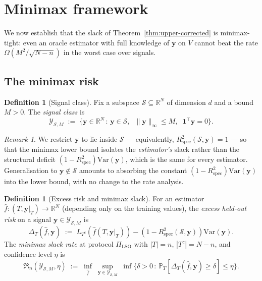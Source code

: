 \documentclass[11pt,a4paper]{article}
\theoremstyle{plain}
\theoremstyle{definition}
\newtheorem{definition}[theorem]{Definition}
\theoremstyle{remark}
\newtheorem{remark}[theorem]{Remark}
\newcommand{\by}{\mathbf{y}}
\newcommand{\bone}{\mathbf{1}}
\newcommand{\R}{\mathbb{R}}
\newcommand{\Var}{\mathrm{Var}}
\newcommand{\Rspec}{R^2_{\mathrm{spec}}}
\newcommand{\Scal}{\mathcal{S}}
\newcommand{\Ycal}{\mathcal{Y}}
\newcommand{\frR}{\mathfrak{R}}
\begin{document}
\section{Minimax framework}
\label{sec:minimax}

We now establish that the slack of Theorem~\ref{thm:upper-corrected} is
minimax-tight: even an oracle estimator with full knowledge of $\by$ on
$V$ cannot beat the rate $\Omega(M^2/\sqrt{N-n})$ in the worst case
over signals.

\subsection{The minimax risk}

\begin{definition}[Signal class]
\label{def:signal-class}
Fix a subspace $\Scal \subseteq \R^N$ of dimension $d$ and a bound
$M > 0$.  The \emph{signal class} is
\begin{equation}
    \Ycal_{\Scal, M}
    \;:=\; \{ \by \in \R^N \,:\, \by \in \Scal,\;\; \|\by\|_\infty \leq M,\;\; \bone^\top \by = 0\}.
    \label{eq:signal-class}
\end{equation}
\end{definition}

\begin{remark}
\label{rem:why-signal-in-S}
We restrict $\by$ to lie inside $\Scal$ — equivalently, $\Rspec(\Scal, \by) = 1$ —
so that the minimax lower bound isolates the \emph{estimator's} slack rather
than the structural deficit $(1-\Rspec)\Var(\by)$, which is the same for every
estimator.  Generalisation to $\by \notin \Scal$ amounts to absorbing the
constant $(1-\Rspec)\Var(\by)$ into the lower bound, with no change to the
rate analysis.
\end{remark}

\begin{definition}[Excess risk and minimax slack]
\label{def:excess-risk}
For an estimator $\hat f : (T, \by|_T) \to \R^N$ (depending only on the
training values), the \emph{excess held-out risk} on a signal $\by \in
\Ycal_{\Scal,M}$ is
\begin{equation}
    \Delta_T(\hat f, \by)
    \;:=\; L_{T^c}(\hat f(T, \by|_T)) - (1 - \Rspec(\Scal, \by)) \Var(\by).
\end{equation}
The \emph{minimax slack rate} at protocol $\Pi_{\mathrm{LSO}}$ with
$|T|=n$, $|T^c| = N-n$, and confidence level $\eta$ is
\begin{equation}
    \frR_n(\Ycal_{\Scal, M}, \eta)
    \;:=\;
    \inf_{\hat f}\;\sup_{\by \in \Ycal_{\Scal, M}}\;
        \inf\big\{\delta > 0 \,:\, \mathbb{P}_T[\Delta_T(\hat f, \by) \geq \delta] \leq \eta\big\}.
    \label{eq:minimax-slack}
\end{equation}
\end{definition}
\end{document}
